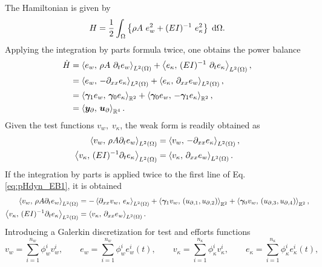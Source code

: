 The Hamiltonian is given by 
\begin{equation}
H = \energy{\rho A \ e_w^2 + (EI)^{-1}\ e_\kappa^2}.
\end{equation}
Applying the integration by parts formula twice, one obtains the power balance
\begin{equation}
\begin{aligned}
\dot{H} &= \inner[L^2(\Omega)]{e_w}{\rho A \ \partial_{t} e_w} + \inner[L^2(\Omega)]{e_\kappa}{(E I)^{-1} \ \partial_{t} e_\kappa}, \\
&=\inner[L^2(\Omega)]{e_w}{-\partial_{xx} e_\kappa} + \inner[L^2(\Omega)]{e_\kappa}{\partial_{xx} e_w}, \\
&=\inner[\mathbb{R}^2]{\bm\gamma_{1} e_w}{\bm\gamma_{0} e_\kappa} + \inner[\mathbb{R}^2]{\bm\gamma_{0} e_w}{-\bm\gamma_{1} e_\kappa}, \\
&= \inner[\mathbb{R}^4]{\bm{y}_\partial}{\bm{u}_\partial}.
\end{aligned}
\end{equation}
Given the test functions $v_w, \; v_\kappa$, the weak form is readily obtained as 
\begin{equation}\label{eq:weak_EB}
\begin{aligned}
\inner[L^2(\Omega)]{v_w}{\rho A \partial_t e_w} &= \inner[L^2(\Omega)]{v_w}{-\partial_{xx} e_\kappa}, \\
\inner[L^2(\Omega)]{v_\kappa}{(EI)^{-1} \partial_t e_\kappa} &= \inner[L^2(\Omega)]{v_\kappa}{\partial_{xx} e_w}. \\
\end{aligned}
\end{equation}
If the integration by parts is applied twice to the first line of Eq. \eqref{eq:pHdyn_EB1}, it is obtained
\begin{equation}\label{eq:weak_EB_Hess}
\begin{aligned}
\inner[L^2(\Omega)]{v_w}{\rho A \partial_t e_w} &= -\inner[L^2(\Omega)]{\partial_{xx} v_w}{e_\kappa} + \inner[\mathbb{R}^2]{\bm\gamma_1 v_w}{({u}_{\partial, 1}, {u}_{\partial, 2})} + \inner[\mathbb{R}^2]{\bm\gamma_0 v_w}{({u}_{\partial, 3}, {u}_{\partial, 4})}, \\
\inner[L^2(\Omega)]{v_\kappa}{(EI)^{-1} \partial_t e_\kappa} &= \inner[L^2(\Omega)]{v_\kappa}{\partial_{xx} e_w}. \\
\end{aligned}
\end{equation}
Introducing a Galerkin discretization for test and efforts functions
\begin{equation}
v_w = \sum_{i = 1}^{n_w} \phi_w^i v_w^i, \qquad e_w = \sum_{i = 1}^{n_w} \phi_w^i e_w^i(t),
\qquad v_\kappa = \sum_{i = 1}^{n_\kappa} \phi_\kappa^i v_\kappa^i, \qquad e_\kappa = \sum_{i = 1}^{n_\kappa} \phi_\kappa^i e_\kappa^i(t),
\end{equation} 
